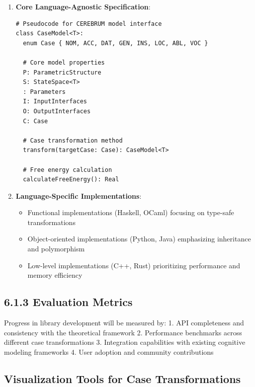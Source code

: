 \documentclass[
  11pt,
  letterpaper,
]{article}
\providecommand{\tightlist}{%
  \setlength{\itemsep}{0pt}\setlength{\parskip}{0pt}}
\begin{document}
\begin{enumerate}
\def\labelenumi{\arabic{enumi}.}
\item
  \textbf{Core Language-Agnostic Specification}:

\begin{verbatim}
# Pseudocode for CEREBRUM model interface
class CaseModel<T>:
  enum Case { NOM, ACC, DAT, GEN, INS, LOC, ABL, VOC }

  # Core model properties
  P: ParametricStructure
  S: StateSpace<T>
  : Parameters
  I: InputInterfaces
  O: OutputInterfaces
  C: Case

  # Case transformation method
  transform(targetCase: Case): CaseModel<T>

  # Free energy calculation
  calculateFreeEnergy(): Real
\end{verbatim}
\item
  \textbf{Language-Specific Implementations}:

  \begin{itemize}
  \tightlist
  \item
    Functional implementations (Haskell, OCaml) focusing on type-safe
    transformations
  \item
    Object-oriented implementations (Python, Java) emphasizing
    inheritance and polymorphism
  \item
    Low-level implementations (C++, Rust) prioritizing performance and
    memory efficiency
  \end{itemize}
\end{enumerate}

\hypertarget{evaluation-metrics}{%
\subsection{6.1.3 Evaluation Metrics}\label{evaluation-metrics}}

Progress in library development will be measured by: 1. API completeness
and consistency with the theoretical framework 2. Performance benchmarks
across different case transformations 3. Integration capabilities with
existing cognitive modeling frameworks 4. User adoption and community
contributions

\hypertarget{visualization-tools-for-case-transformations}{%
\subsection{Visualization Tools for Case
Transformations}\label{visualization-tools-for-case-transformations}}
\end{document}
